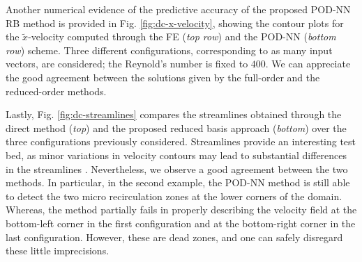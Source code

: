 \documentclass{elsarticle}
\numberwithin{equation}{section}
\theoremstyle{theorem}
\theoremstyle{definition}
\theoremstyle{remark}
\theoremstyle{proposition}
\numberwithin{figure}{section}
\newcommand{\wt}[1]{\widetilde{#1}}
\begin{document}
		
		Another numerical evidence of the predictive accuracy of the proposed POD-NN RB method is provided in Fig. \ref{fig:dc-x-velocity}, showing the contour plots for the $\wt{x}$-velocity computed through the FE (\emph{top row}) and the POD-NN (\emph{bottom row}) scheme. Three different configurations, corresponding to as many input vectors, are considered; the Reynold's number is fixed to $400$. We can appreciate the good agreement between the solutions given by the full-order and the reduced-order methods. 
														
		Lastly, Fig. \ref{fig:dc-streamlines} compares the streamlines obtained through the direct method (\emph{top}) and the proposed reduced basis approach (\emph{bottom}) over the three configurations previously considered. Streamlines provide an interesting test bed, as minor variations in velocity contours may lead to substantial differences in the streamlines \cite{Chen17}. Nevertheless, we observe a good agreement between the two methods. In particular, in the second example, the POD-NN method is still able to detect the two micro recirculation zones at the lower corners of the domain. Whereas, the method partially fails in properly describing the velocity field at the bottom-left corner in the first configuration and at the bottom-right corner in the last configuration. However, these are dead zones, and one can safely disregard these little imprecisions.
				
\end{document}

